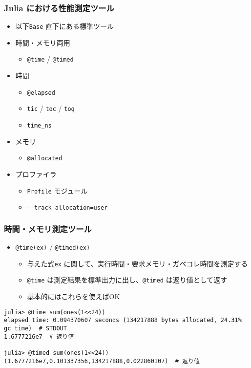 \begin{frame}[containsverbatim]
\frametitle{Julia における性能測定ツール}
\begin{itemize}
  \item 以下\verb|Base| 直下にある標準ツール
  \item 時間・メモリ両用
    \begin{itemize}
      \item \verb|@time| / \verb|@timed|
    \end{itemize}
  \item 時間
    \begin{itemize}
      \item \verb|@elapsed|
      \item \verb|tic| / \verb|toc| / \verb|toq|
      \item \verb|time_ns|
    \end{itemize}
  \item メモリ
    \begin{itemize}
      \item \verb|@allocated|
    \end{itemize}
  \item プロファイラ
    \begin{itemize}
      \item \verb|Profile| モジュール
      \item \verb|--track-allocation=user|
    \end{itemize}
\end{itemize}
\end{frame}

\begin{frame}[containsverbatim]
  \frametitle{時間・メモリ測定ツール}
  \begin{itemize}
    \item \verb|@time(ex)| / \verb|@timed(ex)|
      \begin{itemize}
        \item 与えた式\verb|ex| に関して、実行時間・要求メモリ・ガベコレ時間を測定する
        \item \verb|@time| は測定結果を標準出力に出し、\verb|@timed| は返り値として返す
        \item 基本的にはこれらを使えばOK
      \end{itemize}
  \end{itemize}
  \begin{lstlisting}
julia> @time sum(ones(1<<24))
elapsed time: 0.094370607 seconds (134217888 bytes allocated, 24.31% gc time)  # STDOUT
1.6777216e7  # 返り値

julia> @timed sum(ones(1<<24))
(1.6777216e7,0.101337356,134217888,0.022860107)  # 返り値
  \end{lstlisting}
\end{frame}

